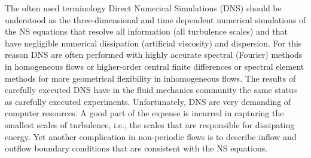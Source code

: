 

The often used terminology Direct Numerical Simulations (DNS) should be understood as the three-dimensional and time dependent numerical simulations of the NS equations that resolve all information (all turbulence scales) and that have negligible numerical dissipation (artificial viscosity) and dispersion. For this reason DNS are often performed with highly accurate spectral (Fourier) methods \cite{CanutoHussainiQuarteroniEtAl1988} in homogeneous flows or higher-order central finite differences or spectral element methods \cite{Blackburn2009} for more geometrical flexibility in inhomogeneous flows. The results of carefully executed DNS have in the fluid mechanics community the same status as carefully executed experiments. Unfortunately, DNS are very demanding of computer resources. A good part of the expense is incurred in capturing the smallest scales of turbulence, i.e., the scales that are responsible for dissipating energy. Yet another complication in non-periodic flows is to describe inflow and outflow boundary conditions that are consistent with the NS equations.

